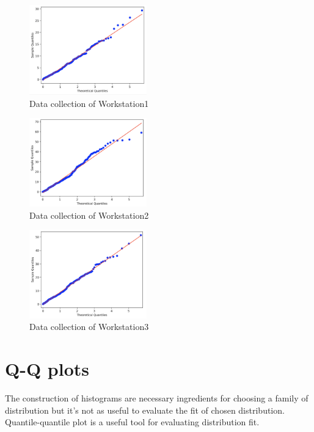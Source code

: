 \documentclass{article}
\begin{document}
\begin{figure}[htbp]
\begin{center}
\includegraphics[width=2in]{hist4.png}
\caption{Data collection of Workstation1}
\label{data4}
\end{center}
\end{figure}

\begin{figure}[htbp]
\begin{center}
\includegraphics[width=2in]{hist5.png}
\caption{Data collection of Workstation2}
\label{data5}
\end{center}
\end{figure}

\begin{figure}[htbp]
\begin{center}
\includegraphics[width=2in]{hist6.png}
\caption{Data collection of Workstation3}
\label{data6}
\end{center}
\end{figure}

\section{Q-Q plots}

The construction of histograms are necessary ingredients for choosing a family of distribution but it's not as useful to evaluate the fit of chosen distribution. Quantile-quantile plot is a useful tool for evaluating distribution fit.
\end{document}
